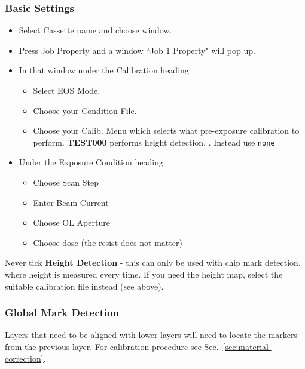 \subsubsection{Basic Settings}
\label{sec:basic-settings}

\begin{itemize}
\item Select Cassette name and choose window.
\item Press Job Property and a window ``Job 1 Property" will pop up.
\item In that window under the Calibration heading
  \begin{itemize}
  \item Select EOS Mode.
  \item Choose your Condition File.
  \item Choose your Calib. Menu which selects what pre-exposure calibration to perform. \textbf{TEST000} performs height detection. . Instead use \texttt{none}
  \end{itemize}
\item Under the Exposure Condition heading
  \begin{itemize}
  \item Choose Scan Step
  \item Enter Beam Current
  \item Choose OL Aperture
  \item Choose dose (the resist does not matter)
  \end{itemize}
\end{itemize}

\begin{framed}\noindent
  Never tick \textbf{Height Detection} - this can only be used with chip mark detection, where height is measured every time. If you need the height map, select the suitable calibration file instead (see above).
\end{framed}

\newpage
\subsubsection{Global Mark Detection}
\label{sec:glob-mark-detect}

\begin{framed}\noindent
  Layers that  need to  be aligned  with lower  layers will  need to  locate the
  markers from the previous layer. For calibration procedure see Sec.~\ref{sec:material-correction}.
\end{framed}

